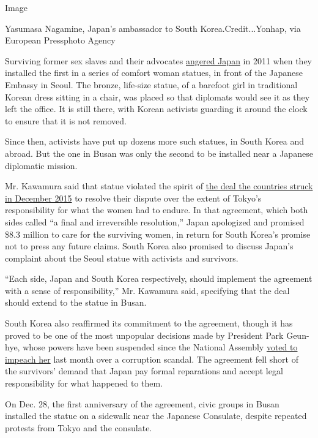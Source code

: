 Image

Yasumasa Nagamine, Japan's ambassador to South Korea.Credit...Yonhap,
via European Pressphoto Agency

Surviving former sex slaves and their advocates
\href{http://www.nytimes3xbfgragh.onion/2011/12/16/world/asia/statute-in-seoul-becomes-focal-point-of-dispute-between-south-korea-and-japan.html}{angered
Japan} in 2011 when they installed the first in a series of comfort
woman statues, in front of the Japanese Embassy in Seoul. The bronze,
life-size statue, of a barefoot girl in traditional Korean dress sitting
in a chair, was placed so that diplomats would see it as they left the
office. It is still there, with Korean activists guarding it around the
clock to ensure that it is not removed.

Since then, activists have put up dozens more such statues, in South
Korea and abroad. But the one in Busan was only the second to be
installed near a Japanese diplomatic mission.

Mr. Kawamura said that statue violated the spirit of
\href{http://www.nytimes3xbfgragh.onion/2015/12/29/world/asia/comfort-women-south-korea-japan.html}{the
deal the countries struck in December 2015} to resolve their dispute
over the extent of Tokyo's responsibility for what the women had to
endure. In that agreement, which both sides called ``a final and
irreversible resolution,'' Japan apologized and promised \$8.3 million
to care for the surviving women, in return for South Korea's promise not
to press any future claims. South Korea also promised to discuss Japan's
complaint about the Seoul statue with activists and survivors.

``Each side, Japan and South Korea respectively, should implement the
agreement with a sense of responsibility,'' Mr. Kawamura said,
specifying that the deal should extend to the statue in Busan.

South Korea also reaffirmed its commitment to the agreement, though it
has proved to be one of the most unpopular decisions made by President
Park Geun-hye, whose powers have been suspended since the National
Assembly
\href{http://www.nytimes3xbfgragh.onion/2016/12/09/world/asia/south-korea-president-park-geun-hye-impeached.html}{voted
to impeach her} last month over a corruption scandal. The agreement fell
short of the survivors' demand that Japan pay formal reparations and
accept legal responsibility for what happened to them.

On Dec. 28, the first anniversary of the agreement, civic groups in
Busan installed the statue on a sidewalk near the Japanese Consulate,
despite repeated protests from Tokyo and the consulate.

